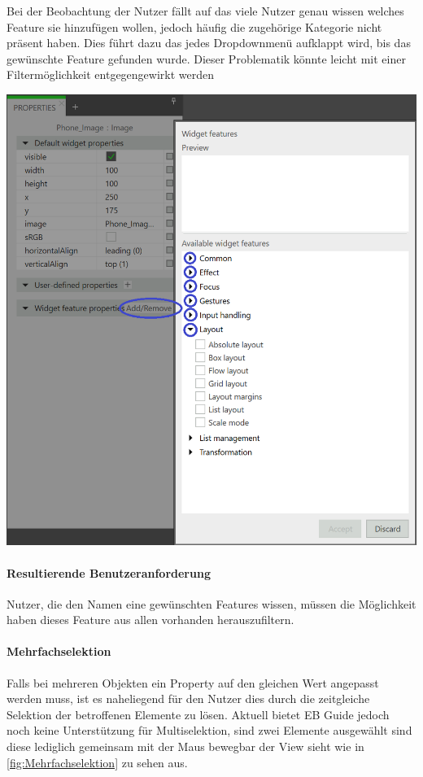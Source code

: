 Bei der Beobachtung der Nutzer fällt auf das viele Nutzer genau wissen welches Feature sie hinzufügen wollen, jedoch häufig die zugehörige Kategorie nicht präsent haben.
Dies führt dazu das jedes Dropdownmenü aufklappt wird, bis das gewünschte Feature gefunden wurde.
Dieser Problematik könnte leicht mit einer Filtermöglichkeit entgegengewirkt werden

\begin{center}
  \includegraphics[scale=0.5]{figures/WidgetFeatureProperty.png}
  \label{fig:WidgetFeatureProperty}
\end{center}

\paragraph{Resultierende Benutzeranforderung}
Nutzer, die den Namen eine gewünschten Features wissen, müssen die Möglichkeit haben dieses Feature aus allen vorhanden herauszufiltern.

\paragraph{Mehrfachselektion}
Falls bei mehreren Objekten ein Property auf den gleichen Wert angepasst werden muss, ist es naheliegend für den Nutzer dies durch die zeitgleiche Selektion der betroffenen Elemente zu lösen.
Aktuell bietet EB Guide jedoch noch keine Unterstützung für Multiselektion, sind zwei Elemente ausgewählt sind diese lediglich gemeinsam mit der Maus bewegbar der View sieht wie in \cref{fig:Mehrfachselektion} zu sehen aus.

